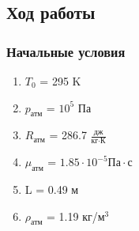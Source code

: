 \documentclass[12pt,a4paper]{article}
\begin{document}
\subsection*{Ход работы}
    \subsubsection*{Начальные условия}
    \begin{enumerate}
        \item $T_0$ = 295 K
        \item $p_{\text{атм}}$ = $10^{5}$ Па
        \item $R_{\text{атм}}$ = 286.7 $\frac{\text{дж}}{\text{кг}\cdot \text{К}}$
        \item $\mu_{\text{атм}}$ = $1.85 \cdot 10^{-5} \text{Па} \cdot с$
        \item L = 0.49 м
        \item $\rho_{\text{атм}}$ = 1.19 кг/$\text{м}^3$
    \end{enumerate}
\end{document}
